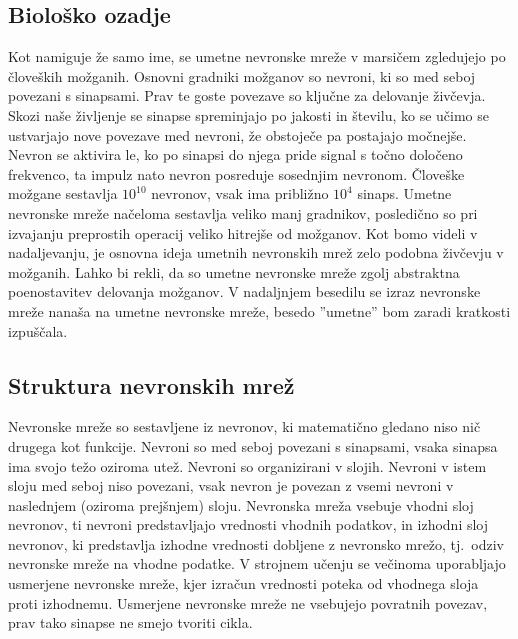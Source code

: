 \documentclass[mat1]{fmfdelo}
\begin{document}
\subsection{Biološko ozadje}
Kot namiguje že samo ime, se umetne nevronske mreže v marsičem zgledujejo po človeških možganih. Osnovni gradniki možganov so nevroni, ki so med seboj povezani s sinapsami. Prav te goste povezave so ključne za delovanje živčevja. Skozi naše življenje se sinapse spreminjajo po jakosti in številu, ko se učimo se ustvarjajo nove povezave med nevroni, že obstoječe pa postajajo močnejše. Nevron se aktivira le,  ko po sinapsi do njega pride signal s točno določeno frekvenco, ta impulz nato nevron posreduje sosednjim nevronom. Človeške možgane sestavlja $10^{10}$ nevronov, vsak  ima približno $10^4$ sinaps. Umetne nevronske mreže načeloma sestavlja veliko manj gradnikov, posledično so pri izvajanju preprostih operacij veliko hitrejše od možganov. Kot bomo videli v nadaljevanju, je osnovna ideja umetnih nevronskih mrež zelo podobna živčevju v možganih. Lahko bi rekli, da so umetne nevronske mreže zgolj abstraktna poenostavitev delovanja možganov. V nadaljnjem besedilu se izraz nevronske mreže nanaša na umetne nevronske mreže, besedo ''umetne'' bom zaradi kratkosti izpuščala.   
%
\subsection{Struktura nevronskih mrež}
Nevronske mreže so sestavljene iz nevronov, ki matematično gledano niso nič drugega kot funkcije. Nevroni so med seboj povezani s sinapsami, vsaka sinapsa ima svojo težo oziroma utež.
 Nevroni so organizirani v slojih. Nevroni v istem sloju med seboj niso povezani, vsak nevron je povezan z vsemi nevroni v naslednjem (oziroma prejšnjem) sloju. Nevronska mreža vsebuje vhodni sloj nevronov, ti nevroni predstavljajo vrednosti vhodnih podatkov, in izhodni sloj nevronov, ki predstavlja izhodne vrednosti dobljene z nevronsko mrežo, tj.\ odziv nevronske mreže na vhodne podatke. V strojnem učenju se večinoma uporabljajo usmerjene nevronske mreže, kjer izračun vrednosti poteka od vhodnega sloja proti izhodnemu. Usmerjene nevronske mreže ne vsebujejo povratnih povezav, prav tako sinapse ne smejo tvoriti cikla.
 
\end{document}
